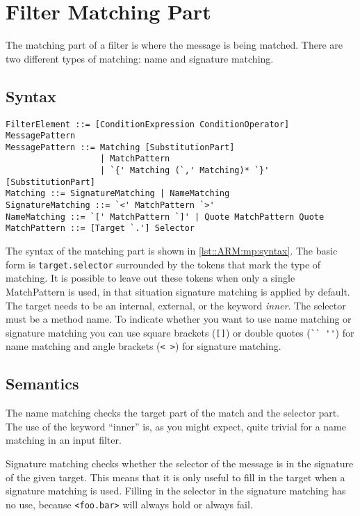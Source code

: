 \chapter{Filter Matching Part}
The matching part of a filter is where the message is being matched. There are
two different types of matching: name and signature matching.

\section*{Syntax}
\begin{lstlisting}[caption={Filter matching part syntax},label=lst::ARM:mp:syntax,style = listing,language = ebnf,float=tpb]
FilterElement ::= [ConditionExpression ConditionOperator] MessagePattern
MessagePattern ::= Matching [SubstitutionPart]
                   | MatchPattern
                   | `{' Matching (`,' Matching)* `}' [SubstitutionPart] 
Matching ::= SignatureMatching | NameMatching
SignatureMatching ::= `<' MatchPattern `>'
NameMatching ::= `[' MatchPattern `]' | Quote MatchPattern Quote
MatchPattern ::= [Target `.'] Selector
\end{lstlisting}
The syntax of the matching part is shown in \autoref{lst::ARM:mp:syntax}. The basic form is
\lstinline|target.selector| surrounded by the tokens that mark the type of matching. It is possible
to leave out these tokens when only a single MatchPattern is used, in that situation signature matching is applied by default.
The target needs to be an internal, external, or the keyword \emph{inner}. The selector must be a method name.
To indicate whether you want to use name matching or signature matching you can use square brackets (\lstinline![]!) or double quotes (\lstinline!`` ''!) for name matching and angle brackets (\lstinline!< >!) for signature matching.

\section*{Semantics}
The name matching checks the target part of the match and the
selector part. The use of the keyword ``inner'' 
is, as you might expect, quite trivial for a name matching in an input filter.

Signature matching checks whether the selector of the message is in the signature of the given target. This means that it is only useful to fill in the target when a signature matching is used.
Filling in the selector in the signature matching has no use, because \lstinline|<foo.bar>| will
always hold or always fail.

